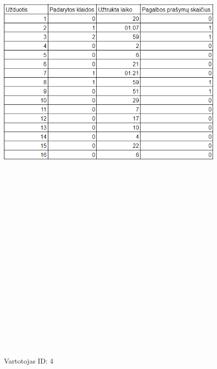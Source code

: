 \documentclass[oneside]{VUMIFPSkursinis}
\begin{document}
	\begin{figure}[h]
			\centering
			\includegraphics[width=15cm,height=60cm,keepaspectratio]{4.png}
			\caption{ Vartotojas ID: 4}
	\end{figure}
\end{document}
